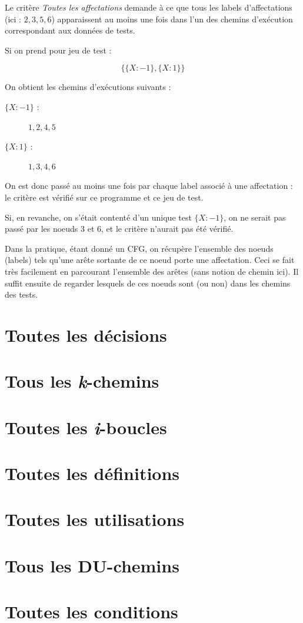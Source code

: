 \documentclass[a4paper, 12pt]{report}
\begin{document}

Le critère \textit{Toutes les affectations} demande à ce que tous les labels d'affectations (ici : $2, 3, 5, 6$) apparaissent au moins une fois dans l'un des chemins d'exécution correspondant aux données de tests.

Si on prend pour jeu de test :

\[ \{
	\{ X : -1\},
	\{ X : 1\}
\} \]

On obtient les chemins d'exécutions suivants :
\begin{description}
\item[$\{ X : -1\}$ : ] $1, 2, 4, 5$
\item[$\{ X : 1\}$ : ] $1, 3, 4, 6$
\end{description}

On est donc passé au moins une fois par chaque label associé à une affectation : le critère est vérifié sur ce programme et ce jeu de test.

Si, en revanche, on s'était contenté d'un unique test $\{ X : -1\}$, on ne serait pas passé par les noeuds $3$ et $6$, et le critère n'aurait pas été vérifié.

Dans la pratique, étant donné un CFG, on récupère l'ensemble des noeuds (labels) tels qu'une arête sortante de ce noeud porte une affectation. Ceci se fait très facilement en parcourant l'ensemble des arêtes (sans notion de chemin ici).
Il suffit ensuite de regarder lesquels de ces noeuds sont (ou non) dans les chemins des tests.

\section{Toutes les décisions}
\section{Tous les \textit{k}-chemins}
\section{Toutes les \textit{i}-boucles}
\section{Toutes les définitions}
\section{Toutes les utilisations}
\section{Tous les DU-chemins}
\section{Toutes les conditions}
\end{document}
